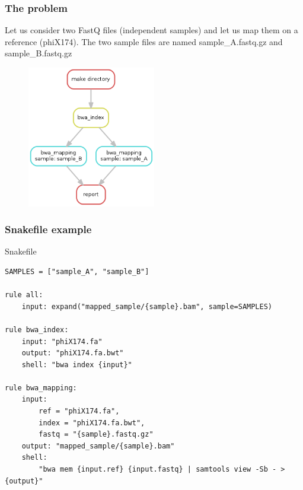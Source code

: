 \documentclass{beamer}
\begin{document}
\begin{frame}
\frametitle{The problem}
Let us consider two FastQ files (independent samples) and let us map them on a reference (phiX174). The two 
sample files are named sample\_A.fastq.gz and sample\_B.fastq.gz
  \begin{figure}
\includegraphics[width=0.5\textwidth, height=0.5\textheight]{images/dag.png}
  \end{figure}
\end{frame}




\begin{frame}[fragile]
    \frametitle{Snakefile example}
    
    \begin{block}{Snakefile}
    \begin{lstlisting}
SAMPLES = ["sample_A", "sample_B"]

rule all:
    input: expand("mapped_sample/{sample}.bam", sample=SAMPLES)

rule bwa_index:
    input: "phiX174.fa"
    output: "phiX174.fa.bwt"
    shell: "bwa index {input}"

rule bwa_mapping:
    input:
        ref = "phiX174.fa",
        index = "phiX174.fa.bwt",
        fastq = "{sample}.fastq.gz"
    output: "mapped_sample/{sample}.bam"
    shell:
        "bwa mem {input.ref} {input.fastq} | samtools view -Sb - > {output}"
    \end{lstlisting}
    \end{block}
\end{frame}
\end{document}
